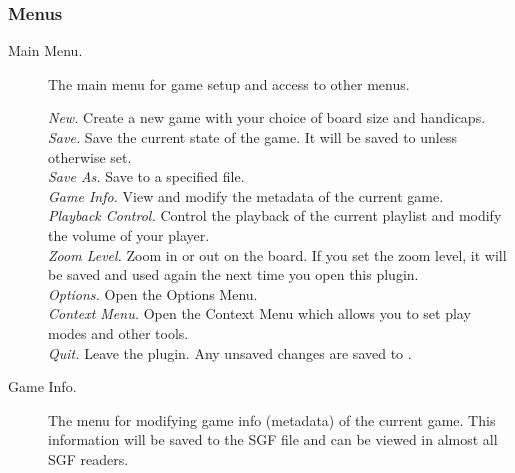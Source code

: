 \subsubsection{Menus}
\begin {description}
\item [Main Menu. ]
    The main menu for game setup and access to other menus.

    \emph {New. } Create a new game with your choice of board size and handicaps. \\
    \emph {Save. } Save the current state of the game.  It will be saved to
     unless otherwise set. \\
    \emph {Save As. } Save to a specified file. \\
    \emph {Game Info. } View and modify the metadata of the current game. \\
    \emph {Playback Control. } Control the playback of the current playlist and
    modify the volume of your player. \\
    \emph {Zoom Level. } Zoom in or out on the board.  If you set the zoom level, it
    will be saved and used again the next time you open this plugin. \\
    \emph {Options. } Open the Options Menu. \\
    \emph {Context Menu. } Open the Context Menu which allows you to set play modes
    and other tools. \\
    \emph {Quit. } Leave the plugin.  Any unsaved changes are saved to
    . \\

\item [Game Info. ]
    The menu for modifying game info (metadata) of the current game.  This
    information will be saved to the SGF file and can be viewed in almost all
    SGF readers.


\end{description}
